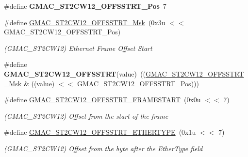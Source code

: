 \begin{DoxyCompactItemize}
\item 
\mbox{\label{group__SAMV71__GMAC_gac98296b0f102a390a351434f6a216585}} 
\#define {\bfseries G\+M\+A\+C\+\_\+\+S\+T2\+C\+W12\+\_\+\+O\+F\+F\+S\+S\+T\+R\+T\+\_\+\+Pos}~7
\item 
\mbox{\label{group__SAMV71__GMAC_ga220e5d51f50d08df75307f2da7f55e42}} 
\#define \mbox{\hyperlink{group__SAMV71__GMAC_ga220e5d51f50d08df75307f2da7f55e42}{G\+M\+A\+C\+\_\+\+S\+T2\+C\+W12\+\_\+\+O\+F\+F\+S\+S\+T\+R\+T\+\_\+\+Msk}}~(0x3u $<$$<$ G\+M\+A\+C\+\_\+\+S\+T2\+C\+W12\+\_\+\+O\+F\+F\+S\+S\+T\+R\+T\+\_\+\+Pos)
\begin{DoxyCompactList}\small\item\em (G\+M\+A\+C\+\_\+\+S\+T2\+C\+W12) Ethernet Frame Offset Start \end{DoxyCompactList}\item 
\mbox{\label{group__SAMV71__GMAC_ga0544cfc06eab3c580a04d4129e6fc718}} 
\#define {\bfseries G\+M\+A\+C\+\_\+\+S\+T2\+C\+W12\+\_\+\+O\+F\+F\+S\+S\+T\+RT}(value)~((\mbox{\hyperlink{group__SAMV71__GMAC_ga220e5d51f50d08df75307f2da7f55e42}{G\+M\+A\+C\+\_\+\+S\+T2\+C\+W12\+\_\+\+O\+F\+F\+S\+S\+T\+R\+T\+\_\+\+Msk}} \& ((value) $<$$<$ G\+M\+A\+C\+\_\+\+S\+T2\+C\+W12\+\_\+\+O\+F\+F\+S\+S\+T\+R\+T\+\_\+\+Pos)))
\item 
\mbox{\label{group__SAMV71__GMAC_gab73da65a37e6dcfbb1def8e5c0e08184}} 
\#define \mbox{\hyperlink{group__SAMV71__GMAC_gab73da65a37e6dcfbb1def8e5c0e08184}{G\+M\+A\+C\+\_\+\+S\+T2\+C\+W12\+\_\+\+O\+F\+F\+S\+S\+T\+R\+T\+\_\+\+F\+R\+A\+M\+E\+S\+T\+A\+RT}}~(0x0u $<$$<$ 7)
\begin{DoxyCompactList}\small\item\em (G\+M\+A\+C\+\_\+\+S\+T2\+C\+W12) Offset from the start of the frame \end{DoxyCompactList}\item 
\mbox{\label{group__SAMV71__GMAC_ga37c45624ec98a85ed649d8acdc13e541}} 
\#define \mbox{\hyperlink{group__SAMV71__GMAC_ga37c45624ec98a85ed649d8acdc13e541}{G\+M\+A\+C\+\_\+\+S\+T2\+C\+W12\+\_\+\+O\+F\+F\+S\+S\+T\+R\+T\+\_\+\+E\+T\+H\+E\+R\+T\+Y\+PE}}~(0x1u $<$$<$ 7)
\begin{DoxyCompactList}\small\item\em (G\+M\+A\+C\+\_\+\+S\+T2\+C\+W12) Offset from the byte after the Ether\+Type field \end{DoxyCompactList}\item 

\end{DoxyCompactItemize}

